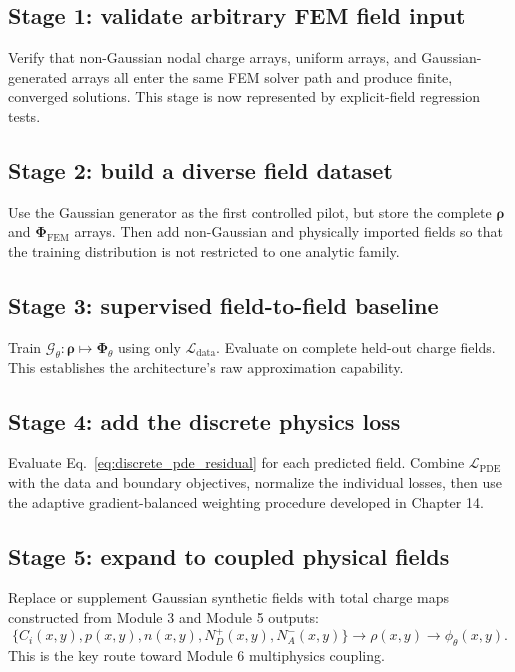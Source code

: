 \documentclass[11pt]{article}
\newcommand{\Ldata}{\mathcal{L}_{\mathrm{data}}}
\newcommand{\Lpde}{\mathcal{L}_{\mathrm{PDE}}}
\begin{document}
\subsection{Stage 1: validate arbitrary FEM field input}

Verify that non-Gaussian nodal charge arrays, uniform arrays, and Gaussian-generated arrays all enter the same FEM solver path and produce finite, converged solutions. This stage is now represented by explicit-field regression tests.

\subsection{Stage 2: build a diverse field dataset}

Use the Gaussian generator as the first controlled pilot, but store the complete $\bm{\rho}$ and $\bm{\Phi}_{\mathrm{FEM}}$ arrays. Then add non-Gaussian and physically imported fields so that the training distribution is not restricted to one analytic family.

\subsection{Stage 3: supervised field-to-field baseline}

Train $\mathcal{G}_{\theta}:\bm{\rho}\mapsto\bm{\Phi}_{\theta}$ using only $\Ldata$. Evaluate on complete held-out charge fields. This establishes the architecture's raw approximation capability.

\subsection{Stage 4: add the discrete physics loss}

Evaluate Eq.~\eqref{eq:discrete_pde_residual} for each predicted field. Combine $\Lpde$ with the data and boundary objectives, normalize the individual losses, then use the adaptive gradient-balanced weighting procedure developed in Chapter 14.

\subsection{Stage 5: expand to coupled physical fields}

Replace or supplement Gaussian synthetic fields with total charge maps constructed from Module 3 and Module 5 outputs:
\begin{equation}
\{C_i(x,y),p(x,y),n(x,y),N_D^+(x,y),N_A^-(x,y)\}
\longrightarrow
\rho(x,y)
\longrightarrow
\phi_{\theta}(x,y).
\end{equation}
This is the key route toward Module 6 multiphysics coupling.
\end{document}
